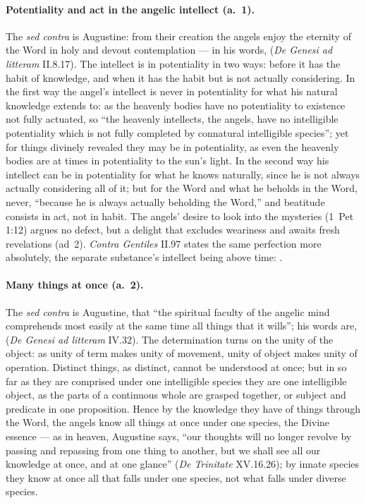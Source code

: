 \paragraph{Potentiality and act in the angelic intellect (a.~1).} The
\emph{sed contra} is Augustine: from their creation the angels enjoy the
eternity of the Word in holy and devout contemplation --- in his words,
 (\emph{De Genesi ad litteram} II.8.17). The
intellect is in potentiality in two ways: before it has the habit of
knowledge, and when it has the habit but is not actually considering. In
the first way the angel's intellect is never in potentiality for what his
natural knowledge extends to: as the heavenly bodies have no potentiality
to existence not fully actuated, so ``the heavenly intellects, the angels,
have no intelligible potentiality which is not fully completed by
connatural intelligible species''; yet for things divinely revealed they
may be in potentiality, as even the heavenly bodies are at times in
potentiality to the sun's light. In the second way his intellect can be in
potentiality for what he knows naturally, since he is not always actually
considering all of it; but for the Word and what he beholds in the Word,
never, ``because he is always actually beholding the Word,'' and beatitude
consists in act, not in habit. The angels' desire to look into the
mysteries (1~Pet 1:12) argues no defect, but a delight that excludes
weariness and awaits fresh revelations (ad~2). \emph{Contra Gentiles}
II.97 states the same perfection more absolutely, the separate
substance's intellect being above time: .

\paragraph{Many things at once (a.~2).} The \emph{sed contra} is
Augustine, that ``the spiritual faculty of the angelic mind comprehends
most easily at the same time all things that it wills''; his words are,
 (\emph{De Genesi ad
litteram} IV.32). The determination turns on the unity of the object: as
unity of term makes unity of movement, unity of object makes unity of
operation. Distinct things, as distinct, cannot be understood at once; but
in so far as they are comprised under one intelligible species they are
one intelligible object, as the parts of a continuous whole are grasped
together, or subject and predicate in one proposition. Hence by the
knowledge they have of things through the Word, the angels know all things
at once under one species, the Divine essence --- as in heaven, Augustine
says, ``our thoughts will no longer revolve by passing and repassing from
one thing to another, but we shall see all our knowledge at once, and at
one glance'' (\emph{De Trinitate} XV.16.26); by innate species they know
at once all that falls under one species, not what falls under diverse
species.

